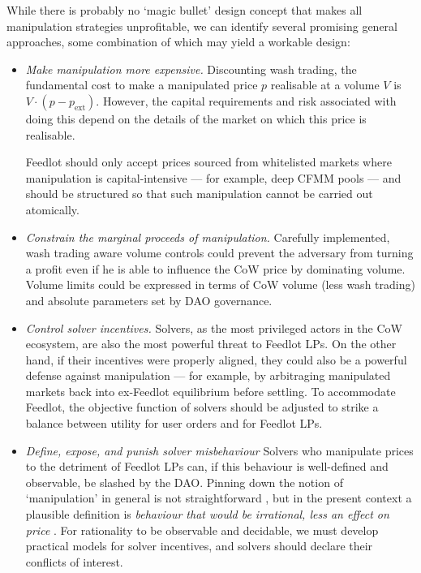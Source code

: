 \documentclass[a4paper,10pt]{article}
\theoremstyle{remark}
\begin{document}
While there is probably no `magic bullet' design concept that makes all manipulation strategies unprofitable, we can identify several promising general approaches, some combination of which may yield a workable design:
%
\begin{itemize}    
  \item
    \emph{Make manipulation more expensive.}
    Discounting wash trading, the fundamental cost to make a manipulated price $p$ realisable at a volume $V$ is $V\cdot(p-p_\mathrm{ext})$. 
    However, the capital requirements and risk associated with doing this depend on the details of the market on which this price is realisable.
    
    Feedlot should only accept prices sourced from whitelisted markets where manipulation is capital-intensive --- for example, deep CFMM pools --- and should be structured so that such manipulation cannot be carried out atomically.
    
  \item
    \emph{Constrain the marginal proceeds of manipulation.}
    Carefully implemented, wash trading aware volume controls could prevent the adversary from turning a profit even if he is able to influence the CoW price by dominating volume.
    Volume limits could be expressed in terms of CoW volume (less wash trading) and absolute parameters set by DAO governance.
    
  \item
    \emph{Control solver incentives.}
    Solvers, as the most privileged actors in the CoW ecosystem, are also the most powerful threat to Feedlot LPs.
    On the other hand, if their incentives were properly aligned, they could also be a powerful defense against manipulation --- for example, by arbitraging manipulated markets back into ex-Feedlot equilibrium before settling.
    To accommodate Feedlot, the objective function of solvers should be adjusted to strike a balance between utility for user orders and for Feedlot LPs.
    
  \item
    \emph{Define, expose, and punish solver misbehaviour}
    Solvers who manipulate prices to the detriment of Feedlot LPs can, if this behaviour is well-defined and observable, be slashed by the DAO.
    Pinning down the notion of `manipulation' in general is not straightforward \cite{kyle2008define, zhang2022competition}, but in the present context a plausible definition is \emph{behaviour that would be irrational, less an effect on price} \cite{perdue1987manipulation}.
    For rationality to be observable and decidable, we must develop practical models for solver incentives, and solvers should declare their conflicts of interest.
  
\end{itemize}
\end{document}

